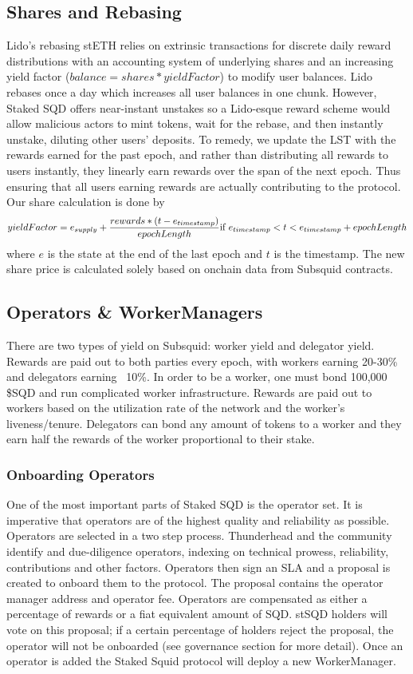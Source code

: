 \documentclass{article}
\begin{document}
\subsection{Shares and Rebasing}
Lido's rebasing stETH relies on extrinsic transactions for discrete daily reward distributions with an accounting system of underlying shares and an increasing yield factor ($balance = shares * yieldFactor$) to modify user balances. Lido rebases once a day which increases all user balances in one chunk. However, Staked SQD offers near-instant unstakes so a Lido-esque reward scheme would allow malicious actors to mint tokens, wait for the rebase, and then instantly unstake, diluting other users' deposits. To remedy, we update the LST with the rewards earned for the past epoch, and rather than distributing all rewards to users instantly, they linearly earn rewards over the span of the next epoch. Thus ensuring that all users earning rewards are actually contributing to the protocol. Our share calculation is done by
\[yieldFactor=e_{supply}+\frac{rewards*(t-e_{timestamp})}{epochLength}  \\ \text{if } e_{timestamp} < t < e_{timestamp} + epochLength\]
where $e$ is the state at the end of the last epoch and $t$ is the timestamp. The new share price is calculated solely based on onchain data from Subsquid contracts. 
\subsection{Operators \& WorkerManagers}
There are two types of yield on Subsquid: worker yield and delegator yield. Rewards are paid out to both parties every epoch, with workers earning 20-30\% and delegators earning ~10\%. In order to be a worker, one must bond 100,000 \$SQD and run complicated worker infrastructure. Rewards are paid out to workers based on the utilization rate of the network and the worker's liveness/tenure. Delegators can bond any amount of tokens to a worker and they earn half the rewards of the worker proportional to their stake. 
\subsubsection{Onboarding Operators}
One of the most important parts of Staked SQD is the operator set. It is imperative that operators are of the highest quality and reliability as possible. Operators are selected in a two step process. Thunderhead and the community identify and due-diligence operators, indexing on technical prowess, reliability, contributions and other factors. Operators then sign an SLA and a proposal is created to onboard them to the protocol. The proposal contains the operator manager address and operator fee. Operators are compensated as either a percentage of rewards or a fiat equivalent amount of SQD. stSQD holders will vote on this proposal; if a certain percentage of holders reject the proposal, the operator will not be onboarded (see governance section for more detail). Once an operator is added the Staked Squid protocol will deploy a new WorkerManager.
\end{document}
